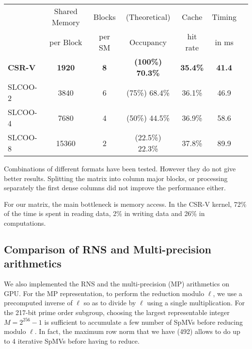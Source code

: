\documentclass[runningheads,orivec]{llncs}
\begin{document}
\vspace*{-0.25cm}



  \begin{center}
    \begin{tabular}{|l||c|c|c|c|c|c|}
      \hline
       & \footnotesize Shared Memory & \footnotesize Blocks & \footnotesize (Theoretical) & \footnotesize Cache & \footnotesize Timing \\
       & \footnotesize per Block & \footnotesize per SM & \footnotesize Occupancy  & \footnotesize hit rate & \footnotesize in ms \\  
      \hline
	  \hline
      \bf \footnotesize CSR-V & \bf \footnotesize 1920 & \bf \footnotesize 8 & \bf \footnotesize (100\%) 70.3\% & \bf \footnotesize 35.4\% & \bf \footnotesize 41.4 \\
      \hline
      \footnotesize SLCOO-2 & \footnotesize 3840 & \footnotesize 6 & \footnotesize (75\%) 68.4\% & \footnotesize 36.1\% & \footnotesize 46.9 \\
      \hline 	
      \footnotesize SLCOO-4 & \footnotesize 7680 & \footnotesize 4 & \footnotesize (50\%) 44.5\% & \footnotesize 36.9\% & \footnotesize 58.6 \\
      \hline
      \footnotesize SLCOO-8 & \footnotesize 15360 & \footnotesize 2 & \footnotesize (22.5\%) 22.3\% & \footnotesize 37.8\% & \footnotesize 89.9 \\
      \hline
    \end{tabular}
  \end{center}

\vspace*{-0.25cm}

Combinations of different formats have been tested. However they do not give better results. Splitting the matrix into column major blocks, or processing separately the first dense columns did not improve the performance either.    

For our matrix, the main bottleneck is memory access. In the CSR-V kernel, 72\% of the time is spent in reading data, 2\% in writing data and 26\% in computations. 


\vspace*{-0.25cm}
\subsection{Comparison of RNS and Multi-precision arithmetics}
\vspace*{-0.25cm}

\label{RNS vs MP}
We also implemented the RNS and the multi-precision (MP) arithmetics on GPU. For the MP representation, to perform the reduction modulo $\ell$, we use a precomputed inverse of $\ell$ so as to divide by $\ell$ using a single multiplication. For the 217-bit prime order subgroup, choosing the largest representable integer $M=2^{256}-1$ is sufficient to accumulate a few number of SpMVs before reducing modulo $\ell$. In fact, the maximum row norm that we have (492) allows to do up to 4 iterative SpMVs before having to reduce.
\end{document}
